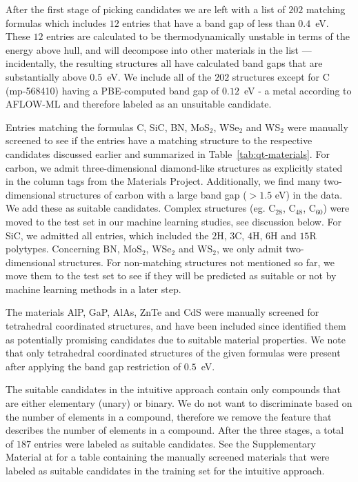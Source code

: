 \documentclass[superscriptaddress,unsortedaddress,
 amsmath,amssymb,
 aps,
]{revtex4-2}
\begin{document}
After the first stage of picking candidates we are left with a list of $202$ matching formulas which includes $12$ entries that have a band gap of less than $0.4$~eV. These $12$ entries are calculated to be thermodynamically 
unstable in terms of the energy above hull, and will decompose into other materials in the list --- incidentally, the resulting structures all have calculated band gaps that are substantially above $0.5$~eV. We include all of the $202$ structures except for C (mp-568410) having a PBE-computed band gap of $0.12$~eV - a metal according to AFLOW-ML and therefore labeled as an unsuitable candidate. 
 
Entries matching the formulas C, SiC, BN, MoS$_2$, WSe$_2$ and WS$_2$ were manually screened to see if the entries have a matching structure to the respective candidates discussed earlier and summarized in Table~\ref{tab:qt-materials}. 
For carbon, we admit three-dimensional diamond-like structures as explicitly stated in the column tags from the Materials Project. Additionally, we find many two-dimensional structures of carbon with a large band gap ($>1.5$ eV) in the data. We add these as suitable candidates. Complex structures (eg. C$_{28}$, C$_{48}$, C$_{60}$) were moved to the test set in our machine learning studies, see discussion below. For SiC, we admitted all entries, which included the $2$H, $3$C, $4$H, $6$H and $15$R polytypes. Concerning BN, MoS$_2$, WSe$_2$ and  WS$_2$, we only admit two-dimensional structures. For non-matching structures not mentioned so far, we move them to the test set to see if they will be predicted as suitable or not by machine learning methods in a later step.

The materials AlP, GaP, AlAs, ZnTe and CdS were manually screened for tetrahedral coordinated structures, and have been included since \citeauthor{Weber2010} \cite{Weber2010}  identified them as potentially promising candidates due to suitable material properties. 
We note that only tetrahedral coordinated structures of the given formulas were present after applying the band gap restriction of $0.5$~eV.

The suitable candidates in the intuitive approach contain only compounds that are either elementary (unary) or binary. We do not want to discriminate based on the number of elements in a compound, therefore we remove the feature that describes the number of elements in a compound. After the three stages, a total of $187$ entries were labeled as suitable candidates.
See the Supplementary Material at \cite{supplementary} for a table containing the manually screened materials that were labeled as suitable candidates in the training set for the intuitive approach. 
\end{document}
